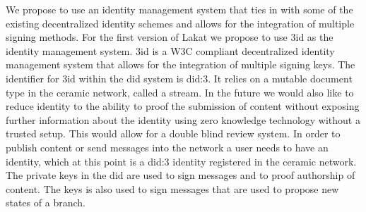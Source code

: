 

We propose to use an identity management system that ties in with some of the existing decentralized identity schemes and allows for the integration of multiple signing methods. For the first version of Lakat we propose to use 3id as the identity management system. 3id is a W3C compliant decentralized identity management system that allows for the integration of multiple signing keys. The identifier for 3id within the did system is did:3. It relies on a mutable document type in the ceramic network, called a stream. In the future we would also like to reduce identity to the ability to proof the submission of content without exposing further information about the identity using zero knowledge technology without a trusted setup. This would allow for a double blind review system. In order to publish content or send messages into the network a user needs to have an identity, which at this point is a did:3 identity registered in the ceramic network. The private keys in the did are used to sign messages and to proof authorship of content. The keys is also used to sign messages that are used to propose new states of a branch.

